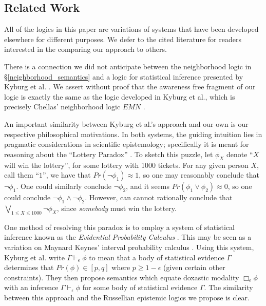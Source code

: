 \subsection{Related Work}

All of the logics in this paper are variations of
systems that have been developed elsewhere for different purposes.
We defer to the cited literature for readers interested in the
comparing our approach to others.

There is a connection we did not anticipate between the neighborhood 
logic in \S\ref{neighborhood_semantics} and a logic for statistical inference
presented by Kyburg et al. \cite{kyburg_logic_2002}.  We assert
without proof that the awareness free fragment of our logic is exactly
the same as the logic developed in Kyburg et al., which is precisely Chellas'
neighborhood logic $EMN$ \cite[chapter 9]{chellas_modal_1980}.

An important similarity between Kyburg et al.'s approach and our own is
our respective philosophical motivations.  In both systems, the guiding intuition lies in pragmatic
considerations in scientific epistemology; specifically it is meant
for reasoning about the ``Lottery Paradox''
\cite[pg. 197]{kyburg_probability_1961}.  To sketch this puzzle, let
$\phi_X$ denote ``$X$ will win the lottery'', for some lottery with
1000 tickets.  For any given person $X$, call them ``$1$'', we have
that $Pr(\neg \phi_1)
\approx 1$, so one may reasonably conclude that $\neg\phi_1$.  One
could similarly conclude $\neg \phi_2$, and it seems $Pr(\phi_1 \vee
\phi_2) \approx 0$, so one could conclude $\neg\phi_1 \wedge \neg \phi_2$.
However, can cannot rationally conclude that $\bigvee_{1 \leq X \leq 1000}
\neg \phi_X$, since \emph{somebody} must win the lottery.  

One method of resolving this paradox is to employ a system of statistical
inference known as the \emph{Evidential Probability
  Calculus} \cite{kyburg_uncertain_2001}.  
This may be seen as a variation on Maynard Keynes' interval probability 
calculus \cite{keynes_treatise_1921}.  Using this system, Kyburg et
al. write $\Gamma
\vdash_\epsilon \phi$ to mean that a body of statistical evidence
$\Gamma$ determines that $Pr(\phi) \in [p,q]$ where $p \geq
1 - \epsilon$ (given certain other constraints).  They then propose semantics which equate doxastic
modality $\Box_\epsilon \phi$ with an inference $\Gamma \vdash_\epsilon\phi$ for some
body of statistical evidence $\Gamma$.  The similarity between this
approach and the Russellian epistemic logics we propose is clear.

